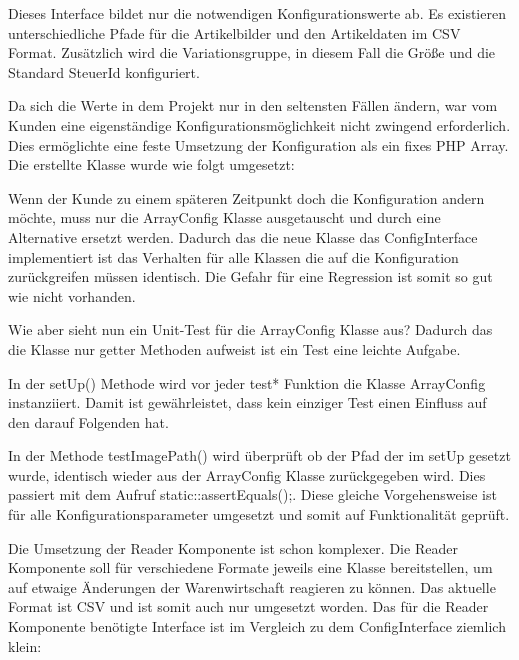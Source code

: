 

Dieses Interface bildet nur die notwendigen Konfigurationswerte ab. Es existieren unterschiedliche Pfade für die Artikelbilder und den Artikeldaten im CSV Format. Zusätzlich wird die Variationsgruppe, in diesem Fall die Größe und die Standard SteuerId konfiguriert.

Da sich die Werte in dem Projekt nur in den seltensten Fällen ändern, war vom Kunden eine eigenständige Konfigurationsmöglichkeit nicht zwingend erforderlich. Dies ermöglichte eine feste Umsetzung der Konfiguration als ein fixes PHP Array. Die erstellte Klasse wurde wie folgt umgesetzt:



Wenn der Kunde zu einem späteren Zeitpunkt doch die Konfiguration andern möchte, muss nur die ArrayConfig Klasse ausgetauscht und durch eine Alternative ersetzt werden. Dadurch das die neue Klasse das ConfigInterface implementiert ist das Verhalten für alle Klassen die auf die Konfiguration zurückgreifen müssen identisch. Die Gefahr für eine Regression ist somit so gut wie nicht vorhanden.

Wie aber sieht nun ein Unit-Test für die ArrayConfig Klasse aus? Dadurch das die Klasse nur getter Methoden aufweist ist ein Test eine leichte Aufgabe. 



In der setUp() Methode wird vor jeder test* Funktion die Klasse ArrayConfig instanziiert. Damit ist gewährleistet, dass kein einziger Test einen Einfluss auf den darauf Folgenden hat.

In der Methode testImagePath() wird überprüft ob der Pfad der im setUp gesetzt wurde, identisch wieder aus der ArrayConfig Klasse zurückgegeben wird. Dies passiert mit dem Aufruf static::assertEquals();. Diese gleiche Vorgehensweise ist für alle Konfigurationsparameter umgesetzt und somit auf Funktionalität geprüft.

Die Umsetzung der Reader Komponente ist schon komplexer. Die Reader Komponente soll für verschiedene Formate jeweils eine Klasse bereitstellen, um auf etwaige Änderungen der Warenwirtschaft reagieren zu können. Das aktuelle Format ist CSV und ist somit auch nur umgesetzt worden. Das für die Reader Komponente benötigte Interface ist im Vergleich zu dem ConfigInterface ziemlich klein:

